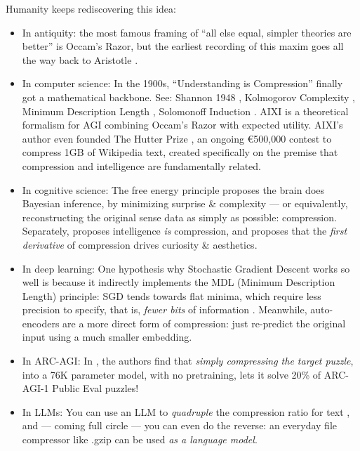 \documentclass[11pt]{article}
\begin{document}
Humanity keeps rediscovering this idea:

\begin{itemize}
    \item In antiquity: the most famous framing of ``all else equal, simpler theories are better'' is Occam's Razor, but the earliest recording of this maxim goes all the way back to Aristotle \citep{sep_simplicity}.
    \item  In computer science: In the 1900s, ``Understanding is Compression'' finally got a mathematical backbone. See: Shannon 1948 \citep{shannon_entropy}, Kolmogorov Complexity \citep{kolmogorov_complexity}, Minimum Description Length \citep{rissanen_mdl}, Solomonoff Induction \citep{solomonoff_induction}. AIXI \citep{aixi} is a theoretical formalism for AGI combining Occam's Razor with expected utility. AIXI's author even founded The Hutter Prize \citep{hutter_prize}, an ongoing €500,000 contest to compress 1GB of Wikipedia text, created specifically on the premise that compression and intelligence are fundamentally related.
    \item In cognitive science: The free energy principle \citep{free_energy_principle} proposes the brain does Bayesian inference, by minimizing surprise \& complexity — or equivalently, reconstructing the original sense data as simply as possible: compression. Separately, \citet{wolff_intelligence} proposes intelligence \textit{is} compression, and \citet{schmidhuber_driven_by_compression} proposes that the \textit{first derivative} of compression drives curiosity \& aesthetics.
    \item In deep learning: One hypothesis why Stochastic Gradient Descent works so well is because it indirectly implements the MDL (Minimum Description Length) principle: SGD tends towards flat minima, which require less precision to specify, that is, \textit{fewer bits} of information \citep{flat_minima,large_batch_sharp_minima}. Meanwhile, auto-encoders \citep{hinton_autoencoder} are a more direct form of compression: just re-predict the original input using a much smaller embedding.
    \item In ARC-AGI: In \citet{arc_without_pretraining}, the authors find that \textit{simply compressing the target puzzle}, into a 76K parameter model, with no pretraining, lets it solve 20\% of ARC-AGI-1 Public Eval puzzles!
    \item In LLMs: You can use an LLM to \textit{quadruple} the compression ratio for text \citep{compress_with_llm}, and — coming full circle — you can even do the reverse: an everyday file compressor like .gzip can be used \textit{as a language model}. \citep{gzip_llm}
\end{itemize}
\end{document}
